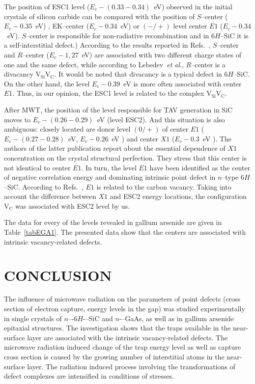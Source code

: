 \documentclass[%
 aip,jap,
 amsmath,amssymb,
 reprint,%
]{revtex4-1}
\begin{document}
The position of ESC1 level ($E_c-(0.33-0.34)$~eV) observed in the initial crystals of silicon carbide can be compared
with the position of $S$--center ($E_c-0.35$~eV) \cite{Lebed1999En,Anikin1991:2En,Anikin1991:3En},
EK–center ($E_c-0.34$~eV)\cite{Kuznets1997En}
or $(-/+)$ level center $E1$ ($E_c-0.34$~eV).\cite{Lebed1999En}
$S$--center is responsible for non-radiative recombination and
in 6$H$–SiC it is a self-interstitial defect.\cite{Lebed1999En})
According to the results reported in Refs.~,
$S$--center and $R$--center ($E_c-1,27$~eV) are associated with two different charge states
of one and the same defect,
while according to Lebedev~\emph{et al}.,\cite{Lebedev2000En}
$R$--center is a divacancy $\mathrm{V}_\mathrm{Si}\mathrm{V}_\mathrm{C}$.
It would be noted that  divacancy is a typical defect in 6$H$--SiC.\cite{SiCBaran,SiCDavid}
On the other hand, the level $E_c-0.39$~eV is more often associated with center $E1$.\cite{SiCWei,SiCKoizumi}
Thus, in our opinion, the ESC1 level is related to the  complex $\mathrm{V}_\mathrm{Si}\mathrm{V}_\mathrm{C}$.

After MWT, the position of the level responsible for TAV generation in SiC moves
to $E_c-(0.26-0.29)$~eV (level ESC2).
And this situation is also ambiguous: closely located are donor level $(0/+)$ of
center $E1$ ($E_c-(0.27-0.28)$~eV,\cite{Hemmingsson}
$E_c-0.26$~eV \cite{SiCWei,SiCKoizumi})
and center $X1$ ($E_c-0.3$~eV \cite{Lebedev2001En}).
The authors of the latter publication report about the essential dependence of $X1$ concentration on the crystal structural perfection.
They stress that this center is not identical to center $E1$.
In turn, the level $E1$ have been identified as the center of negative 
correlation energy \cite{Lebedev2001En,SiCWei}
and dominating intrinsic point defect in $n$--type 6$H$--SiC.\cite{SiCSasaki}
According to Refs.~, $E1$ is related to the carbon vacancy.
Taking into account the difference between $X1$ and ESC2 energy locations,
the configuration $\mathrm{V}_\mathrm{C}$ was associated with ESC2 level by us.


The data for every of the levels revealed in gallium arsenide are given in Table~\ref{tabEGA1}.
The presented data show that the centers are associated with intrinsic vacancy-related defects.




\section{CONCLUSION}
The influence of microwave radiation on the parameters of point defects (cross section of electron capture, energy levels in the gap)
was studied experimentally  in single crystals of $n$–-6$H$-–SiC and  $n$-–GaAs, as well as in gallium arsenide epitaxial structures.
The investigation shows that the traps available in the near-surface layer are associated with the intrinsic
vacancy-related defects.
The microwave radiation induced change of the trap energy level as well as capture cross section
is caused by the growing number of interstitial atoms in the near-surface layer.
The  radiation induced process involving the transformations of defect complexes are intensified in conditions of stresses.
\end{document}
